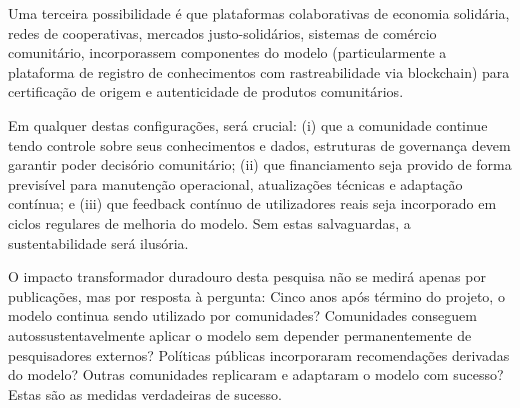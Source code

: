 Uma terceira possibilidade é que plataformas colaborativas de economia solidária, redes de cooperativas, mercados justo-solidários, sistemas de comércio comunitário, incorporassem componentes do modelo (particularmente a plataforma de registro de conhecimentos com rastreabilidade via blockchain) para certificação de origem e autenticidade de produtos comunitários.

Em qualquer destas configurações, será crucial: (i) que a comunidade continue tendo controle sobre seus conhecimentos e dados, estruturas de governança devem garantir poder decisório comunitário; (ii) que financiamento seja provido de forma previsível para manutenção operacional, atualizações técnicas e adaptação contínua; e (iii) que feedback contínuo de utilizadores reais seja incorporado em ciclos regulares de melhoria do modelo. Sem estas salvaguardas, a sustentabilidade será ilusória.

O impacto transformador duradouro desta pesquisa não se medirá apenas por publicações, mas por resposta à pergunta: Cinco anos após término do projeto, o modelo continua sendo utilizado por comunidades? Comunidades conseguem autossustentavelmente aplicar o modelo sem depender permanentemente de pesquisadores externos? Políticas públicas incorporaram recomendações derivadas do modelo? Outras comunidades replicaram e adaptaram o modelo com sucesso? Estas são as medidas verdadeiras de sucesso.



